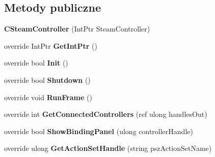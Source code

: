\subsection*{Metody publiczne}
\begin{DoxyCompactItemize}
\item 
\mbox{\label{class_valve_1_1_steamworks_1_1_c_steam_controller_acae582c1e8d270a60dddfea58c837dd6}} 
{\bfseries C\+Steam\+Controller} (Int\+Ptr Steam\+Controller)
\item 
\mbox{\label{class_valve_1_1_steamworks_1_1_c_steam_controller_ab65a45d9f643a9b39699ac8b58e07b38}} 
override Int\+Ptr {\bfseries Get\+Int\+Ptr} ()
\item 
\mbox{\label{class_valve_1_1_steamworks_1_1_c_steam_controller_a12f3b28bcb6f67ac7dfbfe72c2dfaa34}} 
override bool {\bfseries Init} ()
\item 
\mbox{\label{class_valve_1_1_steamworks_1_1_c_steam_controller_acc478dcfd916811c2e38420fbe66798d}} 
override bool {\bfseries Shutdown} ()
\item 
\mbox{\label{class_valve_1_1_steamworks_1_1_c_steam_controller_aca16dd5542abc5cdd752792a38d57428}} 
override void {\bfseries Run\+Frame} ()
\item 
\mbox{\label{class_valve_1_1_steamworks_1_1_c_steam_controller_ab16e677f7377b985131349b45b3ce54b}} 
override int {\bfseries Get\+Connected\+Controllers} (ref ulong handles\+Out)
\item 
\mbox{\label{class_valve_1_1_steamworks_1_1_c_steam_controller_a7067431f0cd6b81216a37591f37d3356}} 
override bool {\bfseries Show\+Binding\+Panel} (ulong controller\+Handle)
\item 
\mbox{\label{class_valve_1_1_steamworks_1_1_c_steam_controller_a8893acb9b0eaf3bde93beb76af7e823d}} 
override ulong {\bfseries Get\+Action\+Set\+Handle} (string psz\+Action\+Set\+Name)

\end{DoxyCompactItemize}
